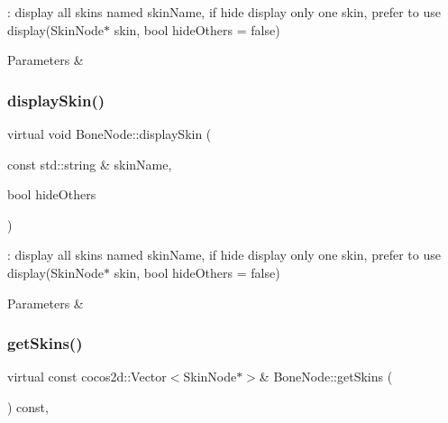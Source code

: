 \+: display all skins named skin\+Name, if hide display only one skin, prefer to use display(Skin\+Node$\ast$ skin, bool hide\+Others = false) 


\begin{DoxyParams}{Parameters}
{\em } & \\
\hline
\end{DoxyParams}
\mbox{\label{classBoneNode_aecbb23abc82a6ff62e2db36b9f24bc5b}} 
\subsubsection{\texorpdfstring{display\+Skin()}{displaySkin()}\hspace{0.1cm}{\footnotesize\ttfamily [4/4]}}
{\footnotesize\ttfamily virtual void Bone\+Node\+::display\+Skin (\begin{DoxyParamCaption}\item[{const std\+::string \&}]{skin\+Name,  }\item[{bool}]{hide\+Others }\end{DoxyParamCaption})\hspace{0.3cm}{\ttfamily [virtual]}}



\+: display all skins named skin\+Name, if hide display only one skin, prefer to use display(Skin\+Node$\ast$ skin, bool hide\+Others = false) 


\begin{DoxyParams}{Parameters}
{\em } & \\
\hline
\end{DoxyParams}
\mbox{\label{classBoneNode_ad1e49b0e034dc298bcc8cf349c820584}} 
\subsubsection{\texorpdfstring{get\+Skins()}{getSkins()}\hspace{0.1cm}{\footnotesize\ttfamily [1/2]}}
{\footnotesize\ttfamily virtual const cocos2d\+::\+Vector$<$Skin\+Node$\ast$$>$\& Bone\+Node\+::get\+Skins (\begin{DoxyParamCaption}{ }\end{DoxyParamCaption}) const\hspace{0.3cm}{\ttfamily [inline]}, {\ttfamily [virtual]}}

